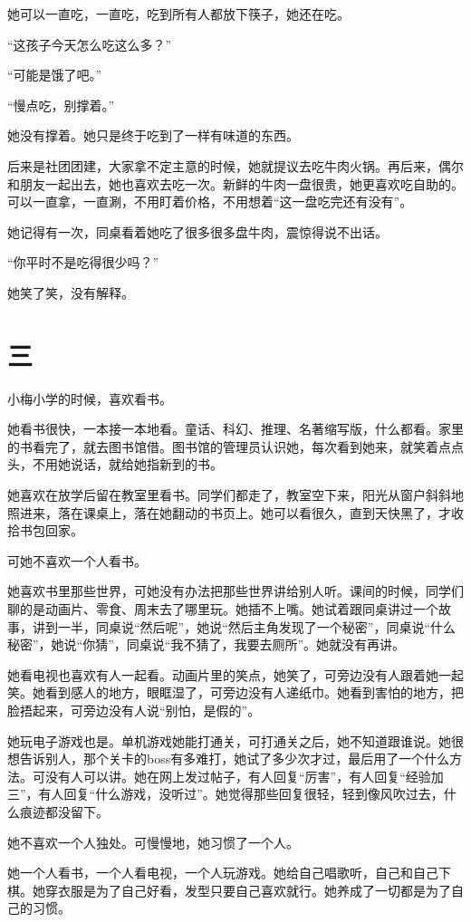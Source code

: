 \documentclass[12pt,a4paper]{ctexart}
\begin{document}
她可以一直吃，一直吃，吃到所有人都放下筷子，她还在吃。

“这孩子今天怎么吃这么多？”

“可能是饿了吧。”

“慢点吃，别撑着。”

她没有撑着。她只是终于吃到了一样有味道的东西。

后来是社团团建，大家拿不定主意的时候，她就提议去吃牛肉火锅。再后来，偶尔和朋友一起出去，她也喜欢去吃一次。新鲜的牛肉一盘很贵，她更喜欢吃自助的。可以一直拿，一直涮，不用盯着价格，不用想着“这一盘吃完还有没有”。

她记得有一次，同桌看着她吃了很多很多盘牛肉，震惊得说不出话。

“你平时不是吃得很少吗？”

她笑了笑，没有解释。

\section{三}

小梅小学的时候，喜欢看书。

她看书很快，一本接一本地看。童话、科幻、推理、名著缩写版，什么都看。家里的书看完了，就去图书馆借。图书馆的管理员认识她，每次看到她来，就笑着点点头，不用她说话，就给她指新到的书。

她喜欢在放学后留在教室里看书。同学们都走了，教室空下来，阳光从窗户斜斜地照进来，落在课桌上，落在她翻动的书页上。她可以看很久，直到天快黑了，才收拾书包回家。

可她不喜欢一个人看书。

她喜欢书里那些世界，可她没有办法把那些世界讲给别人听。课间的时候，同学们聊的是动画片、零食、周末去了哪里玩。她插不上嘴。她试着跟同桌讲过一个故事，讲到一半，同桌说“然后呢”，她说“然后主角发现了一个秘密”，同桌说“什么秘密”，她说“你猜”，同桌说“我不猜了，我要去厕所”。她就没有再讲。

她看电视也喜欢有人一起看。动画片里的笑点，她笑了，可旁边没有人跟着她一起笑。她看到感人的地方，眼眶湿了，可旁边没有人递纸巾。她看到害怕的地方，把脸捂起来，可旁边没有人说“别怕，是假的”。

她玩电子游戏也是。单机游戏她能打通关，可打通关之后，她不知道跟谁说。她很想告诉别人，那个关卡的boss有多难打，她试了多少次才过，最后用了一个什么方法。可没有人可以讲。她在网上发过帖子，有人回复“厉害”，有人回复“经验加三”，有人回复“什么游戏，没听过”。她觉得那些回复很轻，轻到像风吹过去，什么痕迹都没留下。

她不喜欢一个人独处。可慢慢地，她习惯了一个人。

她一个人看书，一个人看电视，一个人玩游戏。她给自己唱歌听，自己和自己下棋。她穿衣服是为了自己好看，发型只要自己喜欢就行。她养成了一切都是为了自己的习惯。
\end{document}
